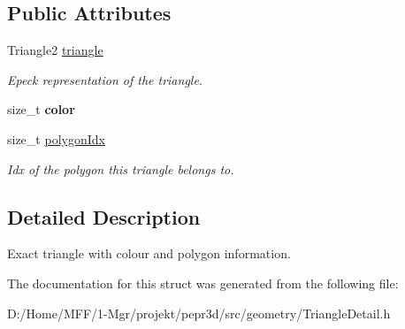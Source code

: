 \subsection*{Public Attributes}
\begin{DoxyCompactItemize}
\item 
\mbox{\label{structpepr3d_1_1_triangle_detail_1_1_exact_triangle_a8c7a1db1bb87182448972c58ef053caf}} 
Triangle2 \mbox{\hyperlink{structpepr3d_1_1_triangle_detail_1_1_exact_triangle_a8c7a1db1bb87182448972c58ef053caf}{triangle}}
\begin{DoxyCompactList}\small\item\em Epeck representation of the triangle. \end{DoxyCompactList}\item 
\mbox{\label{structpepr3d_1_1_triangle_detail_1_1_exact_triangle_a66959e4b747023fe1211b974fc0062b0}} 
size\+\_\+t {\bfseries color}
\item 
\mbox{\label{structpepr3d_1_1_triangle_detail_1_1_exact_triangle_a111197095d54e403e689e775ecfe58c5}} 
size\+\_\+t \mbox{\hyperlink{structpepr3d_1_1_triangle_detail_1_1_exact_triangle_a111197095d54e403e689e775ecfe58c5}{polygon\+Idx}}
\begin{DoxyCompactList}\small\item\em Idx of the polygon this triangle belongs to. \end{DoxyCompactList}\end{DoxyCompactItemize}


\subsection{Detailed Description}
Exact triangle with colour and polygon information. 

The documentation for this struct was generated from the following file\+:\begin{DoxyCompactItemize}
\item 
D\+:/\+Home/\+M\+F\+F/1-\/\+Mgr/projekt/pepr3d/src/geometry/Triangle\+Detail.\+h\end{DoxyCompactItemize}
